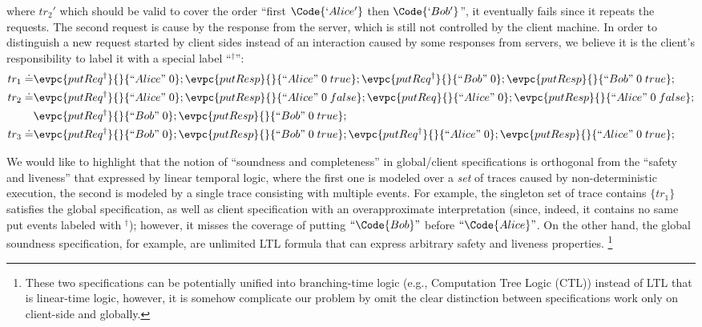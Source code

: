 where $tr_2'$ which should be valid to cover the order ``first $\Code{`Alice'}$ then $\Code{`Bob'}$'', it eventually fails since it repeats the requests. The second request is cause by the response from the server, which is still not controlled by the client machine. In order to distinguish a new request started by client sides instead of an interaction caused by some responses from servers, we believe it is the client's responsibility to label it with a special label ``$ ^\dagger$'':
{\small\begin{align*}
    tr_1 \doteq &\evpc{putReq^\dagger}{}{``Alice"\; 0};\evpc{putResp}{}{``Alice"\; 0\; true}; \evpc{putReq^\dagger}{}{``Bob"\; 0};\evpc{putResp}{}{``Bob"\; 0\; true};
    \\tr_2 \doteq &\evpc{putReq^\dagger}{}{``Alice"\; 0};\evpc{putResp}{}{``Alice"\; 0\; false};
    \evpc{putReq}{}{``Alice"\; 0};\evpc{putResp}{}{``Alice"\; 0\; false};
    \\&\evpc{putReq^\dagger}{}{``Bob"\; 0};\evpc{putResp}{}{``Bob"\; 0\; true};
    \\tr_3 \doteq &\evpc{putReq^\dagger}{}{``Bob"\; 0};\evpc{putResp}{}{``Bob"\; 0\; true};
    \evpc{putReq^\dagger}{}{``Alice"\; 0};\evpc{putResp}{}{``Alice"\; 0\; true};
\end{align*}}\noindent

We would like to highlight that the notion of ``soundness and completeness'' in global/client specifications is orthogonal from the ``safety and liveness'' that expressed by linear temporal logic, where the first one is modeled over a \emph{set} of traces caused by non-deterministic execution, the second is modeled by a single trace consisting with multiple events. For example, the singleton set of trace contains $\{tr_1\}$ satisfies the global specification, as well as client specification with an overapproximate interpretation (since, indeed, it contains no same put events labeled with $^\dagger$); however, it misses the coverage of putting $``\Code{Bob}"$ before  $``\Code{Alice}"$. On the other hand, the global soundness specification, for example, are unlimited LTL formula that can express arbitrary safety and liveness properties. \footnote{These two specifications can be potentially unified into branching-time logic (e.g., Computation Tree Logic (CTL)) instead of LTL that is linear-time logic, however, it is somehow complicate our problem by omit the clear distinction between specifications work only on client-side and globally.}

